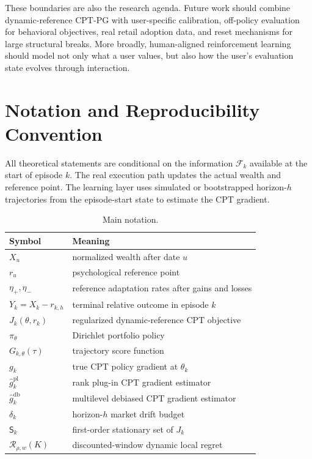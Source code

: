 \documentclass[11pt]{article}
\newcommand{\1}{\mathbf 1}
\newcommand{\cF}{\mathcal F}
\newcommand{\CPT}{\ensuremath{\mathrm{CPT}}\xspace}
\newcommand{\CPTPG}{\ensuremath{\mathrm{CPT\mbox{-}PG}}\xspace}
\newcommand{\Reg}{\mathcal R}
\newcommand{\Sta}{\mathsf S}
\newcommand{\etaP}{\eta_{+}}
\newcommand{\etaM}{\eta_{-}}
\newcommand{\db}{\mathrm{db}}
\newcommand{\pl}{\mathrm{pl}}
\begin{document}
These boundaries are also the research agenda.  Future work should combine dynamic-reference \CPTPG with user-specific calibration, off-policy evaluation for behavioral objectives, real retail adoption data, and reset mechanisms for large structural breaks.  More broadly, human-aligned reinforcement learning should model not only what a user values, but also how the user's evaluation state evolves through interaction.

\clearpage



\clearpage
\appendix

\section{Notation and Reproducibility Convention}\label{app:notation}

All theoretical statements are conditional on the information $\cF_k$ available at the start of episode $k$.  The real execution path updates the actual wealth and reference point.  The learning layer uses simulated or bootstrapped horizon-$h$ trajectories from the episode-start state to estimate the \CPT gradient.

\begin{table}[h]
\centering
\caption{Main notation.}
\begin{tabular}{ll}
\toprule
Symbol & Meaning \\
\midrule
$X_u$ & normalized wealth after date $u$ \\
$r_u$ & psychological reference point \\
$\etaP,\etaM$ & reference adaptation rates after gains and losses \\
$Y_k=X_k-r_{k,h}$ & terminal relative outcome in episode $k$ \\
$J_k(\theta,r_k)$ & regularized dynamic-reference \CPT objective \\
$\pi_\theta$ & Dirichlet portfolio policy \\
$G_{k,\theta}(\tau)$ & trajectory score function \\
$g_k$ & true \CPT policy gradient at $\theta_k$ \\
$\widehat g_k^{\pl}$ & rank plug-in \CPT gradient estimator \\
$\widehat g_k^{\db}$ & multilevel debiased \CPT gradient estimator \\
$\delta_k$ & horizon-$h$ market drift budget \\
$\Sta_k$ & first-order stationary set of $J_k$ \\
$\Reg_{\rho,w}(K)$ & discounted-window dynamic local regret \\
\bottomrule
\end{tabular}
\end{table}
\end{document}
